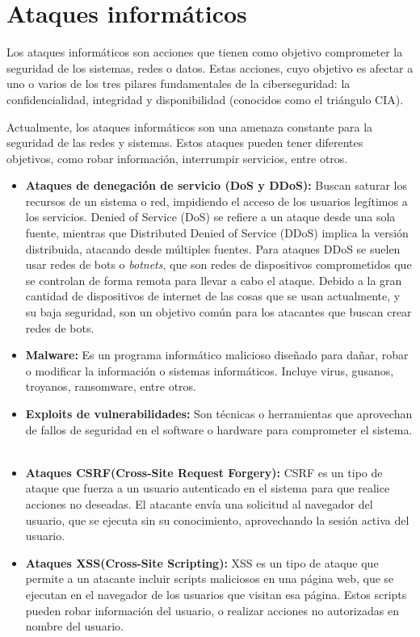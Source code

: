\section{Ataques informáticos}
Los ataques informáticos son acciones que tienen como objetivo comprometer la seguridad de los sistemas, redes o datos.
Estas acciones, cuyo objetivo es afectar a uno o varios de los tres pilares fundamentales de la ciberseguridad: la confidencialidad, integridad y disponibilidad (conocidos como el triángulo CIA).~\cite{NicholasEdwards2020, Chaeikar2012} 

Actualmente, los ataques informáticos son una amenaza constante para la seguridad de las redes y sistemas. Estos ataques pueden tener diferentes objetivos, como robar información, interrumpir servicios, entre otros.

\begin{itemize}
    \item \textbf{Ataques de denegación de servicio (DoS y DDoS):} Buscan saturar los recursos de un sistema o red, impidiendo el acceso de los usuarios legítimos a los servicios. Denied of Service (DoS) se refiere a un ataque desde una sola fuente, mientras que Distributed Denied of Service (DDoS) implica la versión distribuida, atacando desde múltiples fuentes. Para ataques DDoS se suelen usar redes de bots o \textit{botnets}, que son redes de dispositivos comprometidos que se controlan de forma remota para llevar a cabo el ataque. Debido a la gran cantidad de dispositivos de internet de las cosas que se usan actualmente, y su baja seguridad, son un objetivo común para los atacantes que buscan crear redes de bots. ~\cite{kolias2017}

    \item \textbf{Malware:} Es un programa informático malicioso diseñado para dañar, robar o modificar la información o sistemas informáticos. Incluye virus, gusanos, troyanos, ransomware, entre otros. ~\cite{SushilJajodia2025}

    \item \textbf{Exploits de vulnerabilidades:} Son técnicas o herramientas que aprovechan de fallos de seguridad en el software o hardware para comprometer el sistema. ~\cite{SushilJajodia2025}

	\item \textbf{Ataques CSRF(Cross-Site Request Forgery):} CSRF es un tipo de ataque que fuerza a un usuario autenticado en el sistema para que realice acciones no deseadas. El atacante envía una solicitud al navegador del usuario, que se ejecuta sin su conocimiento, aprovechando la sesión activa del usuario.

	\item \textbf{Ataques XSS(Cross-Site Scripting):} XSS es un tipo de ataque que permite a un atacante incluir scripts maliciosos en una página web, que se ejecutan en el navegador de los usuarios que visitan esa página. Estos scripts pueden robar información del usuario, o realizar acciones no autorizadas en nombre del usuario.
\end{itemize}

